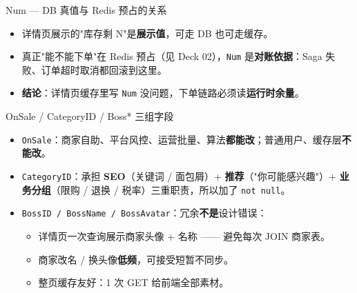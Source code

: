\begin{frame}{Num — DB 真值与 Redis 预占的关系}
\vspace{2mm}
\begin{itemize}
  \item 详情页展示的"库存剩 N"是\textbf{展示值}，可走 DB 也可走缓存。
  \item 真正"能不能下单"在 Redis 预占（见 Deck 02），\texttt{Num} 是\textbf{对账依据}：Saga 失败、订单超时取消都回滚到这里。
  \item \textbf{结论}：详情页缓存里写 \texttt{Num} 没问题，下单链路必须读\textbf{运行时余量}。
\end{itemize}
\end{frame}

\begin{frame}{OnSale / CategoryID / Boss* 三组字段}
\begin{itemize}
  \item \texttt{OnSale}：商家自助、平台风控、运营批量、算法\textbf{都能改}；普通用户、缓存层\textbf{不能改}。
  \item \texttt{CategoryID}：承担 \textbf{SEO}（关键词 / 面包屑）+ \textbf{推荐}（"你可能感兴趣"）+ \textbf{业务分组}（限购 / 退换 / 税率）三重职责，所以加了 \texttt{not null}。
  \item \texttt{BossID / BossName / BossAvatar}：冗余\textbf{不是}设计错误：
  \begin{itemize}
    \item 详情页一次查询展示商家头像 + 名称 —— 避免每次 JOIN 商家表。
    \item 商家改名 / 换头像\textbf{低频}，可接受短暂不同步。
    \item 整页缓存友好：1 次 GET 给前端全部素材。
  \end{itemize}
\end{itemize}
\end{frame}

